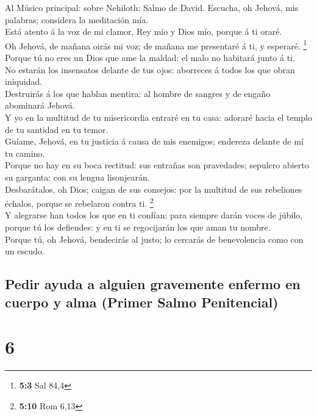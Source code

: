  Al Músico principal: sobre Nehiloth: Salmo de David.
Escucha, oh Jehová, mis palabras; considera la meditación mía.\\
 Está atento á la voz de mi clamor, Rey mío y Dios mío,
porque á ti oraré.\\
 Oh Jehová, de mañana oirás mi voz; de mañana me
presentaré á ti, y esperaré. \footnote{\textbf{5:3} Sal 84,4}\\
 Porque tú no eres un Dios que ame la maldad: el malo no
habitará junto á ti.\\
 No estarán los insensatos delante de tus ojos: aborreces
á todos los que obran iniquidad.\\
 Destruirás á los que hablan mentira: al hombre de sangres
y de engaño abominará Jehová.\\
 Y yo en la multitud de tu misericordia entraré en tu
casa: adoraré hacia el templo de tu santidad en tu temor.\\
 Guíame, Jehová, en tu justicia á causa de mis enemigos;
endereza delante de mí tu camino.\\
 Porque no hay en su boca rectitud: sus entrañas son
pravedades; sepulcro abierto su garganta: con su lengua lisonjearán.\\
 Desbarátalos, oh Dios; caigan de sus consejos: por la
multitud de sus rebeliones échalos, porque se rebelaron contra ti.
\footnote{\textbf{5:10} Rom 6,13}\\
 Y alegrarse han todos los que en ti confían; para
siempre darán voces de júbilo, porque tú los defiendes: y en ti se
regocijarán los que aman tu nombre.\\
 Porque tú, oh Jehová, bendecirás al justo; lo cercarás
de benevolencia como con un escudo.

\hypertarget{pedir-ayuda-a-alguien-gravemente-enfermo-en-cuerpo-y-alma-primer-salmo-penitencial}{%
\subsection{Pedir ayuda a alguien gravemente enfermo en cuerpo y alma
(Primer Salmo
Penitencial)}\label{pedir-ayuda-a-alguien-gravemente-enfermo-en-cuerpo-y-alma-primer-salmo-penitencial}}

\hypertarget{section-5}{%
\section{6}\label{section-5}}

